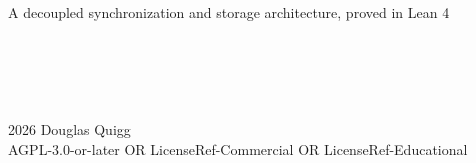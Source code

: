\begin{titlepage}
  \centering
  \vfill
  {\Large{}} \\
  \vspace{0.8cm}
  {\large A decoupled synchronization and storage architecture, proved in Lean 4} \\
  \vspace{2cm}
   \\
  \vspace{1cm}
  {\large{}} \\
  \vfill
   \\
   \\
  \vfill
   \\
  \vfill
  {\footnotesize \textcopyright{} 2026 Douglas Quigg \\
  AGPL-3.0-or-later OR LicenseRef-Commercial OR LicenseRef-Educational}
\end{titlepage}
